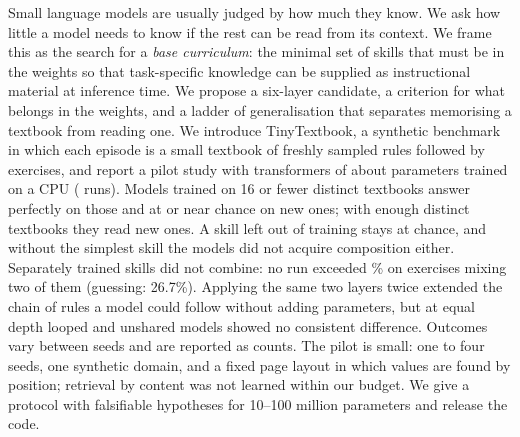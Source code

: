 Small language models are usually judged by how much they know.
We ask how little a model needs to know if the rest can be read from its context.
We frame this as the search for a \emph{base curriculum}: the minimal set of skills that must be in the weights so that task-specific knowledge can be supplied as instructional material at inference time.
We propose a six-layer candidate, a criterion for what belongs in the weights, and a ladder of generalisation that separates memorising a textbook from reading one.
We introduce TinyTextbook, a synthetic benchmark in which each episode is a small textbook of freshly sampled rules followed by exercises, and report a pilot study with transformers of about \NparamsRounded{} parameters trained on a CPU (\TotalRuns{} runs).
Models trained on 16 or fewer distinct textbooks answer perfectly on those and at or near chance on new ones; with enough distinct textbooks they read new ones.
A skill left out of training stays at chance, and without the simplest skill the models did not acquire composition either.
Separately trained skills did not combine: no run exceeded \ETwoMixedMax\% on exercises mixing two of them (guessing: 26.7\%).
Applying the same two layers twice extended the chain of rules a model could follow without adding parameters, but at equal depth looped and unshared models showed no consistent difference.
Outcomes vary between seeds and are reported as counts.
The pilot is small: one to four seeds, one synthetic domain, and a fixed page layout in which values are found by position; retrieval by content was not learned within our budget.
We give a protocol with falsifiable hypotheses for 10--100 million parameters and release the code.
